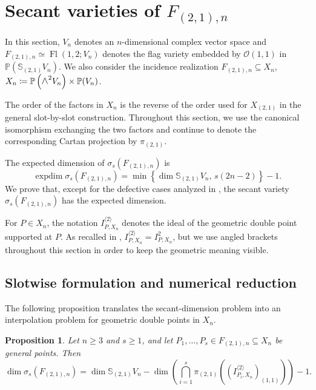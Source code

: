 \documentclass[a4paper,reqno]{amsart}
\theoremstyle{plainnopunct}
\newtheorem{proposition}[proposition]{Proposition}
\theoremstyle{definitionnopunct}
\newcommand{\superwedge}{\mathlarger{\mathlarger{\wedge}}}
\renewcommand{\P}{\mathbb{P}}
\renewcommand{\S}{\mathbb{S}}
\newcommand{\cO}{\mathcal{O}}
\DeclareMathOperator{\expdim}{expdim}
\DeclareMathOperator{\Fl}{Fl}
\begin{document}
\section{Secant varieties of
\texorpdfstring{$F_{(2,1),n}$}{F(2,1;n)}}\label{sec: secants two step flags}

\noindent In this section, $V_n$ denotes an $n$-dimensional complex vector
space and $F_{(2,1),n}
\simeq
\Fl(1,2;V_n)$
denotes the flag variety embedded by $\cO(1,1)$ in $\P\left(\S_{(2,1)}V_n\right)$.
We also consider the incidence realization
$
F_{(2,1),n}
\subseteq
X_n$, $X_n
\coloneq
\P\left(\superwedge^2V_n\right)\times\P(V_n)$.

The order of the factors in $X_n$ is the reverse of the order
used for $X_{(2,1)}$ in the general slot-by-slot construction.
Throughout this section, we use the canonical isomorphism exchanging
the two factors and continue to denote the corresponding Cartan
projection by $\pi_{(2,1)}$.

The expected dimension of $\sigma_s(F_{(2,1),n})$ is
\[
\expdim\sigma_s(F_{(2,1),n})
=
\min
\left\{
\dim\S_{(2,1)}V_n,\,
s(2n-2)
\right\}
-1.
\]
We prove that, except for the defective cases analyzed in
, the secant variety
$\sigma_s(F_{(2,1),n})$ has the expected dimension.

For $P\in X_n$, the notation $I_{P,X_n}^{\langle2\rangle}$
denotes the ideal of the geometric double point supported at $P$. As recalled in
, $I_{P,X_n}^{\langle2\rangle}
=
I_{P,X_n}^{2}$,
but we use angled brackets throughout this section in order to keep
the geometric meaning visible.

\subsection{Slotwise formulation and numerical reduction}
\label{subsect: slotwise formulation numerical reduction}

The following proposition translates the secant-dimension problem into
an interpolation problem for geometric double points in $X_n$.

\begin{proposition}
\label{terracini21}
{Let $n\geq3$ and $s\geq1$,} and let $P_1,\ldots,P_s \in F_{(2,1),n} \subseteq X_n$ be general points. Then
\[
\dim\sigma_s(F_{(2,1),n})
=
\dim\S_{(2,1)}V_n
-
\dim
\left(
\bigcap_{i=1}^s
\pi_{(2,1)}
\left(
\left(
I_{P_i,X_n}^{\langle2\rangle}
\right)_{(1,1)}
\right)
\right)
-1.
\]
\end{proposition}
\end{document}
